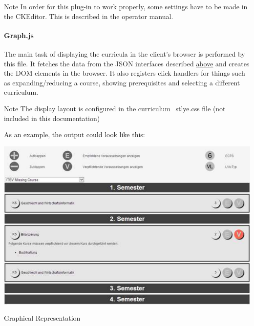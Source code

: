 \begin{DoxyNote}{Note}
In order for this plug-\/in to work properly, some settings have to be made in the C\+K\+Editor. This is described in the operator manual.
\end{DoxyNote}
\hypertarget{index_graph}{}\paragraph{Graph.\+js}\label{index_graph}
The main task of displaying the curricula in the client's browser is performed by this file. It fetches the data from the J\+S\+O\+N interfaces described \hyperlink{index_json}{above} and creates the D\+O\+M elements in the browser. It also registers click handlers for things such as expanding/reducing a course, showing prerequisites and selecting a different curriculum. \begin{DoxyNote}{Note}
The display layout is configured in the curriculum\+\_\+stlye.\+css file (not included in this documentation)
\end{DoxyNote}
As an example, the output could look like this\+:


\begin{DoxyImage}
\includegraphics[width=\textwidth]{Drupal2AGG}
\caption{Graphical Representation}
\end{DoxyImage}


